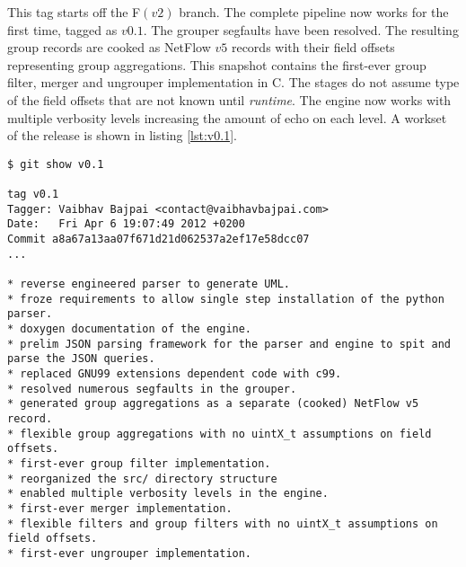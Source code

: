 This tag starts off the F$(v2)$ branch.  The complete pipeline now works for
the first time, tagged as $v0.1$. The grouper segfaults have been resolved.
The resulting group records are cooked as NetFlow $v5$ records with their
field offsets representing group aggregations. 
This snapshot contains the first-ever group filter, merger and ungrouper
implementation in C. The stages do not assume type of the field offsets that
are not known until \emph{runtime}. The engine now works with multiple
verbosity levels increasing the amount of echo on each level. A workset of
the release is shown in listing \ref{lst:v0.1}.

\begin{lstlisting}
$ git show v0.1

tag v0.1
Tagger: Vaibhav Bajpai <contact@vaibhavbajpai.com>
Date:   Fri Apr 6 19:07:49 2012 +0200
Commit a8a67a13aa07f671d21d062537a2ef17e58dcc07
...

* reverse engineered parser to generate UML.
* froze requirements to allow single step installation of the python parser.
* doxygen documentation of the engine.
* prelim JSON parsing framework for the parser and engine to spit and parse the JSON queries.
* replaced GNU99 extensions dependent code with c99.
* resolved numerous segfaults in the grouper.
* generated group aggregations as a separate (cooked) NetFlow v5 record.
* flexible group aggregations with no uintX_t assumptions on field offsets.
* first-ever group filter implementation.
* reorganized the src/ directory structure
* enabled multiple verbosity levels in the engine.
* first-ever merger implementation.
* flexible filters and group filters with no uintX_t assumptions on field offsets.
* first-ever ungrouper implementation.
\end{lstlisting}

